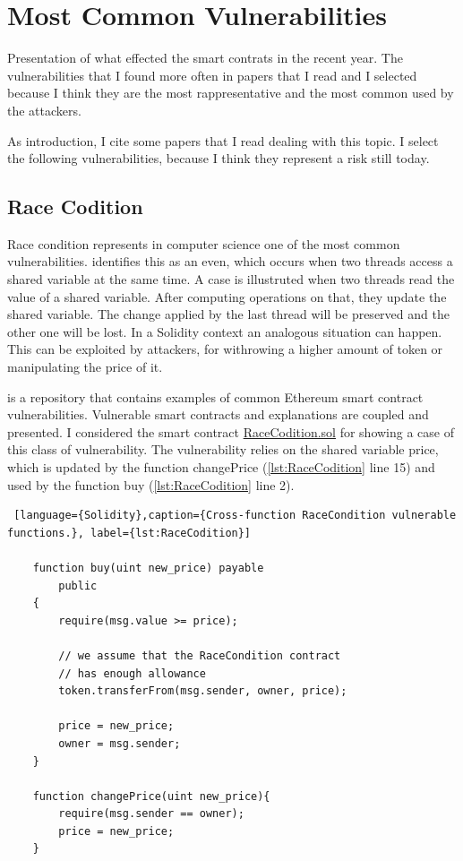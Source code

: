 \chapter{Most Common Vulnerabilities}
\label{ch:Vulnerabilities}

Presentation of what effected the smart contrats in the recent year.
The vulnerabilities that I found more often in papers that I read and I selected because I think they are the 
most rappresentative and the most common used by the attackers.

As introduction, I cite some papers that I read dealing with this topic. I select the following vulnerabilities, because I think they represent a risk still today.

\section{Race Codition}
\label{sec:Vulnerabilities:RaceCondition}
Race condition represents in computer science one of the most common vulnerabilities.
\citet{RaceConditionDef} identifies this as an even,  which occurs when two threads access a shared variable at the same time.
A case is illustruted when two threads read the value of a shared variable. After computing operations on that, they update the shared variable. The change applied by the last thread will be preserved and the other one will be lost.
In a Solidity context an analogous situation can happen. This can be exploited by attackers, for withrowing a higher amount of token or manipulating the price of it.

 is a repository that contains examples of common Ethereum smart contract vulnerabilities.
Vulnerable smart contracts and explanations are coupled and presented. I considered the smart contract \href{https://github.com/crytic/not-so-smart-contracts/blob/master/race_condition/RaceCondition.sol}{RaceCodition.sol} for showing a case of this class of vulnerability.
The vulnerability relies on the shared variable price, which is updated by the function changePrice (\autoref{lst:RaceCodition} line 15) and used by the function buy (\autoref{lst:RaceCodition} line 2).
\begin{lstlisting} [language={Solidity},caption={Cross-function RaceCondition vulnerable functions.}, label={lst:RaceCodition}]

    function buy(uint new_price) payable
        public
    {
        require(msg.value >= price);

        // we assume that the RaceCondition contract
        // has enough allowance
        token.transferFrom(msg.sender, owner, price);

        price = new_price;
        owner = msg.sender;
    }

    function changePrice(uint new_price){
        require(msg.sender == owner);
        price = new_price; 
    }    
\end{lstlisting}

